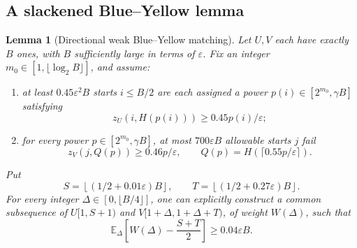 \documentclass[11pt]{article}
\newtheorem{lemma}[lemma]{Lemma}
\theoremstyle{remark}
\newcommand{\eps}{\varepsilon}
\begin{document}
\subsection{A slackened Blue--Yellow lemma}

\begin{lemma}[Directional weak Blue--Yellow matching]\label{lem:BY-directional}
Let $U,V$ each have exactly $B$ ones, with $B$ sufficiently large in terms
of $\eps$.  Fix an integer $m_0\in[1,\lfloor\log_2B\rfloor]$, and assume:
\begin{enumerate}[label=(\roman*)]
\item at least $0.45\eps^2B$ starts $i\le B/2$ are each assigned a power
      $p(i)\in[2^{m_0},\gamma B]$ satisfying
      \[
       z_U(i,H(p(i)))\ge0.45p(i)/\eps;
      \]
\item for every power $p\in[2^{m_0},\gamma B]$, at most $700\eps B$
      allowable starts $j$ fail
      \[
       z_V(j,Q(p))\ge0.46p/\eps,
       \qquad Q(p)=H(\lceil0.55p/\eps\rceil).
      \]
\end{enumerate}
Put
\[
 S=\left\lfloor(1/2+0.01\eps)B\right\rfloor,
 \qquad
 T=\left\lfloor(1/2+0.27\eps)B\right\rfloor.
\]
For every integer $\Delta\in[0,\lfloor B/4\rfloor]$, one can explicitly
construct a common subsequence of $U[1,S+1)$ and
$V[1+\Delta,1+\Delta+T)$, of weight $W(\Delta)$, such that
\begin{equation}\label{eq:BY-reward}
 \mathbb E_\Delta\left[W(\Delta)-\frac{S+T}{2}\right]
 \ge0.04\eps B.
\end{equation}
\end{lemma}
\end{document}
